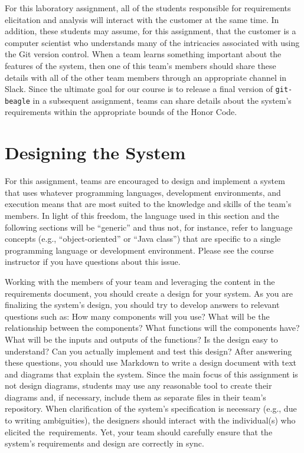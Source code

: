 For this laboratory assignment, all of the students responsible for requirements elicitation and analysis will interact
with the customer at the same time. In addition, these students may assume, for this assignment, that the customer is a
computer scientist who understands many of the intricacies associated with using the Git version control. When a team
learns something important about the features of the system, then one of this team's members should share these details
with all of the other team members through an appropriate channel in Slack. Since the ultimate goal for our course is to
release a final version of {\tt git-beagle} in a subsequent assignment, teams can share details about the system's
requirements within the appropriate bounds of the Honor Code.

\section*{Designing the System}

For this assignment, teams are encouraged to design and implement a system that uses whatever programming languages,
development environments, and execution means that are most suited to the knowledge and skills of the team's members.
In light of this freedom, the language used in this section and the following sections will be ``generic'' and thus not,
for instance, refer to language concepts (e.g., ``object-oriented'' or ``Java class'') that are specific to a single
programming language or development environment. Please see the course instructor if you have questions about this
issue.

Working with the members of your team and leveraging the content in the requirements document, you should create a
design for your system.  As you are finalizing the system's design, you should try to develop answers to relevant
questions such as: How many components will you use? What will be the relationship between the components? What
functions will the components have? What will be the inputs and outputs of the functions?  Is the design easy to
understand?  Can you actually implement and test this design? After answering these questions, you should use Markdown
to write a design document with text and diagrams that explain the system. Since the main focus of this assignment is
not design diagrams, students may use any reasonable tool to create their diagrams and, if necessary, include them as
separate files in their team's repository. When clarification of the system's specification is necessary (e.g., due to
writing ambiguities), the designers should interact with the individual(s) who elicited \mbox{the requirements}. Yet,
your team should carefully ensure that the system's requirements and design are correctly in sync.

